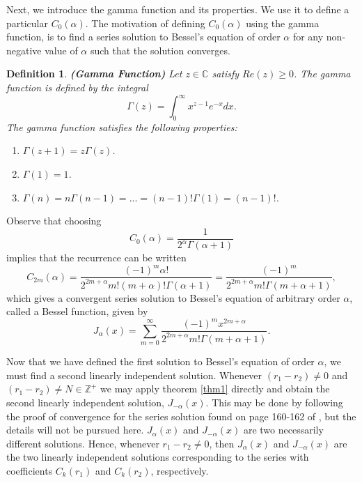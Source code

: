 \documentclass[12pt]{article}
\newtheorem{definition}{Definition}[section]
\theoremstyle{definition}
\numberwithin{equation}{section}
\begin{document}
{Next, we introduce the gamma function and its properties. We use it to define a particular $C_0(\alpha)$. The motivation of defining $C_0(\alpha)$ using the gamma function, is to find a series solution to Bessel's equation of order $\alpha$ for any non-negative value of $\alpha$ such that the solution converges.
\begin{definition}\textbf{(Gamma Function)}
Let $z\in\mathbb{C}$ satisfy $Re(z)\geq 0$. The gamma function is defined by the integral
$$\Gamma(z)=\int_0^\infty x^{z-1}e^{-x}dx.$$ The gamma function satisfies the following properties:
\begin{enumerate}
\item$\Gamma(z+1)=z\Gamma(z)$.
\item$\Gamma(1)=1$.
\item$\Gamma(n)=n\Gamma(n-1)=...=(n-1)!\Gamma(1)=(n-1)!$.
\end{enumerate}
\end{definition}
Observe that choosing
$$C_0(\alpha)=\frac{1}{2^\alpha\Gamma(\alpha+1)}$$
implies that the recurrence can be written
\begin{equation}
C_{2m}(\alpha)=\frac{(-1)^m\alpha!}{2^{2m+\alpha}m!(m+\alpha)!\Gamma(\alpha+1)}=\frac{(-1)^m}{2^{2m+\alpha}m!\Gamma(m+\alpha+1)},
\label{ac2m.eqn}
\end{equation}
which gives a convergent series solution to Bessel's equation of arbitrary order $\alpha$, called a Bessel function, given by
\begin{equation}
J_\alpha(x)=\sum_{m=0}^\infty\frac{(-1)^mx^{2m+\alpha}}{2^{2m+\alpha}m!\Gamma(m+\alpha+1)}.
\label{bessela.eqn}
\end{equation}

Now that we have defined the first solution to Bessel's equation of order $\alpha$, we must find a second linearly independent solution. Whenever $(r_1-r_2)\neq 0$ and $(r_1-r_2)\neq N\in\mathbb{Z}^{+}$ we may apply theorem \ref{thm1} directly and obtain the second linearly independent solution, $J_{-\alpha}(x)$. This may be done by following the proof of convergence for the series solution found on page 160-162 of \cite{codd}, but the details will not be pursued here. $J_\alpha(x)$ and $J_{-\alpha}(x)$ are two necessarily different solutions. Hence, whenever $r_1-r_2\neq 0$, then $J_\alpha(x)$ and $J_{-\alpha}(x)$ are the two linearly independent solutions corresponding to the series with coefficients $C_k(r_1)$ and $C_k(r_2)$, respectively.

}
\end{document}
